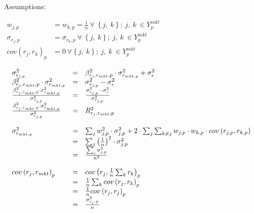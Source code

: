 \documentclass[12pt,]{article}
\begin{document}
Assumptions:

\begin{math}
  \begin{aligned}
   w_{j, p} &= w_{k, p} = \frac{1}{n} \: \forall \: \left \{ j, \: k \right \}; \: j, \: k \: \in Y_{p}^{mkt} \\
   \sigma_{r_{j}, p} &= \sigma_{r_{k}, p} \: \forall \: \left \{ j, \: k \right \}; \: j, \: k \: \in Y_{p}^{mkt} \\
   cov \left ( r_{j}, r_{k} \right )_{p} &= 0 \: \forall \left \{ j, \: k \right \}; \: j, \: k \: \in Y_{p}^{mkt}
  \end{aligned}
\end{math}

\newpage

\[
\begin{array}{l c l}
  \sigma_{r_{j, p}}^{2} & = & \beta_{r_{j}, r_{mkt}, p}^{2} \cdot \sigma_{r_{mkt, p}}^{2} + \sigma_{\epsilon}^{2} \\
  \beta_{r_{j}, r_{mkt}, p}^{2} \cdot \sigma_{r_{mkt, p}}^{2} & = & \sigma_{r_{j, p}}^{2} - \sigma_{\epsilon}^{2} \\
  \frac{\beta_{r_{j}, r_{mkt}, p}^{2} \cdot \sigma_{r_{mkt, p}}^{2}}{\sigma_{r_{j, p}}^{2}} & = & \frac{\sigma_{r_{j, p}}^{2} - \sigma_{\epsilon}^{2}}{\sigma_{r_{j, p}}^{2}} \\
    \frac{\beta_{r_{j}, r_{mkt}, p}^{2} \cdot \sigma_{r_{mkt, p}}^{2}}{\sigma_{r_{j, p}}^{2}}  & = & R_{r_{j}, r_{mkt}, p}^{2} \\ \\
  \sigma_{r_{mkt, p}}^{2} & = & \sum_{j} w_{j, p}^{2} \cdot \sigma_{j, p}^{2} + 2 \cdot \sum_{j} \sum_{k \neq j} w_{j, p} \cdot w_{k, p} \cdot cov \left ( r_{j, p}, r_{k, p} \right ) \\
                          & = & \sum_{j} \left ( \frac{1}{n} \right )^{2} \cdot \sigma_{j, p}^{2} \\
                          & = & \frac{\sum_{j} \sigma_{j, p}^{2}}{n^{2}} \\ \\
  cov \left ( r_{j}, r_{mkt} \right )_{p} & = & cov \left ( r_{j}, \frac{1}{n} \sum_{k} r_{k} \right )_{p} \\
                                          & = & \frac{1}{n} \sum_{k} cov \left ( r_{j}, r_{k} \right )_{p} \\
                                          & = & \frac{1}{n} cov \left ( r_{j}, r_{j} \right )_{p} \\
                                          & = & \frac{\sigma_{r_{j}, p}^{2}}{n} \\ \\

\end{array}\]
\end{document}
